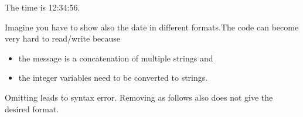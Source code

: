 \documentclass[letterpaper,10pt,english]{sphinxmanual}
\begin{document}
\begin{sphinxVerbatim}[commandchars=\\\{\}]
  
  
  

          
\end{sphinxVerbatim}

\begin{sphinxVerbatim}[commandchars=\\\{\}]
The time is 12:34:56.
\end{sphinxVerbatim}

Imagine you have to show also the date in different formats.The code can become very hard to read/write because
\begin{itemize}
\item {} 
the message is a concatenation of multiple strings and

\item {} 
the integer variables need to be converted to strings.

\end{itemize}

Omitting \sphinxcode{\sphinxupquote{+}} leads to syntax error. Removing  as follows also does not give the desired format.

\begin{sphinxVerbatim}[commandchars=\\\{\}]
        
\end{sphinxVerbatim}
\end{document}
